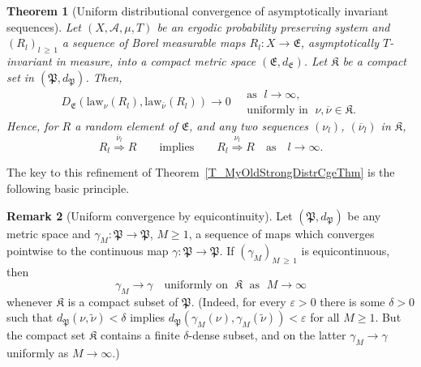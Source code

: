 \documentclass[10pt]{amsart}
\newtheorem{theo}{Theorem}[section]
\theoremstyle{definition}\newtheorem{defi}[theo]{Definition}\newtheorem{rema}[theo]{Remark}\newtheorem{exam}[theo]{Example}\newtheorem{exem}[theo]{Example}\newtheorem{nota}[theo]{Notation}
\newcommand{\clA}{\mathcal{A}}
\newcommand{\law}{\mathrm{law}}
\newcommand{\frkK}{\mathfrak{K}}
\newcommand{\frkP}{\mathfrak{P}}
\newcommand{\frkE}{\mathfrak{E}}
\begin{document}
\begin{theo}[{Uniform distributional convergence of asymptotically invariant sequences}]\label{T_HTSforVaryingMeasures}
Let $(X,\clA,\mu,T)$ be an ergodic probability preserving system and $(R_{l})_{l\,\geq\,1}$ a sequence of Borel measurable maps $R_{l}:X\rightarrow\frkE$, asymptotically $T$-invariant in measure, into a compact metric space $(\frkE,d_{\frkE})$. Let $\frkK$ be a compact set in $(\frkP,d_{\frkP})$. Then,
\begin{equation}\label{Eq_UniformCgeOnCptSetNew}
D_{\frkE}\left(\law_{\nu}(R_{l}),\law_{\overline{\nu}} (R_{l})\right)\longrightarrow0\quad
\begin{aligned}
\text{as }\;l\rightarrow\infty,\\
\text{uniformly in }\;\nu,\overline{\nu}\in\frkK.
\end{aligned}
\end{equation}
Hence, for $R$ a random element of $\frkE$, and any two sequences $(\nu_{l})$, $(\overline{\nu}_{l})$ in $\frkK$,
\begin{equation}\label{Eq_UniformCgeOnCptSetU2}
R_{l}\overset{\overline{\nu}_{l}}{\Longrightarrow}R\qquad \text{implies}\qquad R_{l}\overset{\nu_{l}}{\Longrightarrow}R\quad\text{as}\quad l\rightarrow
\infty.
\end{equation}
\end{theo}



The key to this refinement of Theorem~\ref{T_MyOldStrongDistrCgeThm} is the following basic principle.

\begin{rema}[{Uniform convergence by equicontinuity}]\label{R_UnifCgeByEquiCty}
Let $(\frkP,d_{\frkP})$ be any metric space and $\gamma _{M}:\frkP\rightarrow\frkP$, $M\geq1$, a sequence of maps which converges pointwise to the continuous map $\gamma:\frkP\rightarrow \frkP$. If $(\gamma_{M})_{M\,\geq\,1}$ is equicontinuous, then
\[
\gamma_{M}\longrightarrow\gamma\quad\text{uniformly on }\;\frkK\;\text{ as }\;M\rightarrow\infty
\]
whenever $\frkK$ is a compact subset of $\frkP$. (Indeed, for every $\varepsilon>0$ there is some $\delta>0$ such that $d_{\frkP} (\nu,\widetilde{\nu})<\delta$ implies $d_{\frkP}(\gamma_{M}(\nu),\gamma_{M}(\widetilde{\nu}))<\varepsilon$ for all $M\geq1$. But the compact set $\frkK$ contains a finite $\delta$-dense subset, and on the latter $\gamma_{M}\longrightarrow\gamma$ uniformly as $M\rightarrow\infty$.)
\end{rema}
\end{document}
